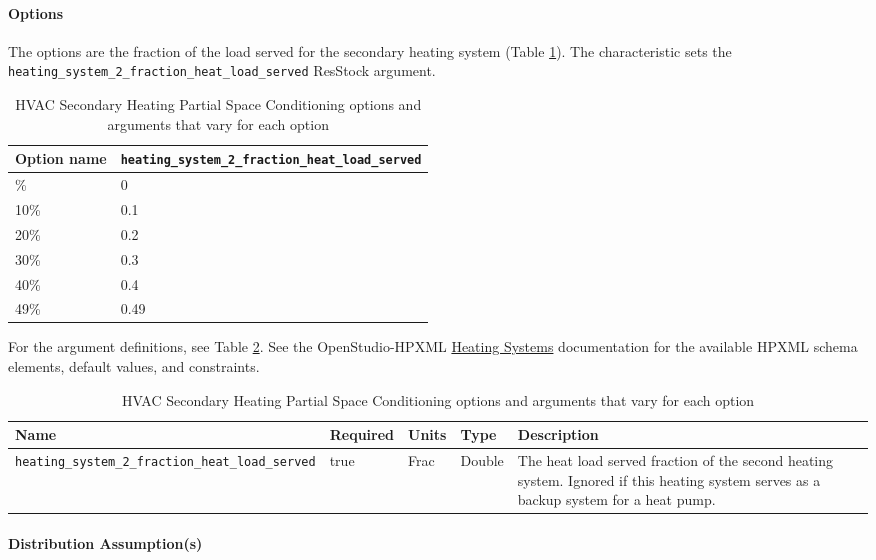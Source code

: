 \paragraph{Options}
The options are the fraction of the load served for the secondary heating system (Table \ref{table:hc_opt_hvac_sec_par}). The characteristic sets the \texttt{heating\_system\_2\_fraction\_heat\_load\_served} ResStock argument.

\begin{longtable}[]{|p{1.5cm}|p{5cm}|} \caption{HVAC Secondary Heating Partial Space Conditioning options and arguments that vary for each option} \label{table:hc_opt_hvac_sec_par} \\
\toprule\noalign{}
Option name &
\texttt{heating\_system\_2\_fraction\_heat\_load\_served} \\
\midrule\noalign{}
\endhead
\bottomrule\noalign{}
\endlastfoot
0\% & 0 \\
10\% & 0.1 \\
20\% & 0.2 \\
30\% & 0.3 \\
40\% & 0.4 \\
49\% & 0.49 \\
\end{longtable}

For the argument definitions, see Table \ref{table:arg_def_hvac_sec_par}. See the OpenStudio-HPXML \href{https://openstudio-hpxml.readthedocs.io/en/v1.8.1/workflow_inputs.html#hpxml-heating-systems}{Heating Systems} documentation for the available HPXML schema elements, default values, and constraints.

\begin{longtable}[]{|p{4cm}|p{1.5cm}|p{1.3cm}|p{1.1cm}|p{3.3cm}|}\caption{HVAC Secondary Heating Partial Space Conditioning options and arguments that vary for each option} \label{table:arg_def_hvac_sec_par} \\
\toprule\noalign{}
Name & Required & Units & Type &  Description \\
\midrule\noalign{}
\endhead
\bottomrule\noalign{}
\endlastfoot
\texttt{heating\_system\_2\_fraction\_heat\_load\_served} & true & Frac
& Double &  The heat load served fraction of the second heating system.
Ignored if this heating system serves as a backup system for a heat
pump. \\
\end{longtable}

\paragraph{Distribution Assumption(s)}

